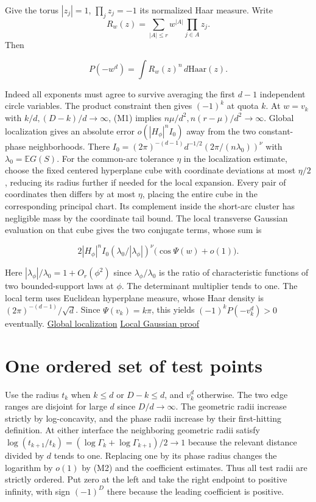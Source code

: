 Give the torus $|z_j|=1$, $\prod_j z_j=-1$ its normalized Haar measure. Write
\[R_w(z)=\sum_{|A|\le r} w^{|A|}\prod_{j\in A} z_j.\]
Then

\begin{equation*}
P(-w^d)=\int R_w(z)^n\,d\mathrm{Haar}(z).
\end{equation*}

Indeed all exponents must agree to survive averaging the first $d-1$ independent circle variables. The product constraint then gives $(-1)^k$ at quota $k$. At $w=v_k$ with $k/d,(D-k)/d\to\infty$, (M1) implies $n\mu/d^2,n(r-\mu)/d^2\to\infty$. Global localization gives an absolute error $o(|H_\phi|^nI_0)$ away from the two constant-phase neighborhoods. There $I_0=(2\pi)^{-(d-1)}d^{-1/2}(2\pi/(n\lambda_0))^{\nu}$ with $\lambda_0=\mathbb E G(S)$. For the common-arc tolerance $\eta$ in the localization estimate, choose the fixed centered hyperplane cube with coordinate deviations at most $\eta/2$, reducing its radius further if needed for the local expansion. Every pair of coordinates then differs by at most $\eta$, placing the entire cube in the corresponding principal chart. Its complement inside the short-arc cluster has negligible mass by the coordinate tail bound. The local transverse Gaussian evaluation on that cube gives the two conjugate terms, whose sum is

\begin{equation*}
2 |H_\phi|^n I_0 (\lambda_0/|\lambda_\phi|)^\nu
\big(\cos\Psi(w)+o(1)\big).
\end{equation*}

Here $|\lambda_\phi|/\lambda_0=1+O_r(\phi^2)$ since $\lambda_\phi/\lambda_0$ is the ratio of characteristic functions of two bounded-support laws at $\phi$. The determinant multiplier tends to one. The local term uses Euclidean hyperplane measure, whose Haar density is $(2\pi)^{-(d-1)}/\sqrt d$. Since $\Psi(v_k)=k\pi$, this yields $(-1)^kP(-v_k^d)>0$ eventually. \hyperref[sec:localization]{Global localization} \enspace \hyperref[sec:transverse]{Local Gaussian proof}

\section{One ordered set of test points}

Use the radius $t_k$ when $k\le d$ or $D-k\le d$, and $v_k^d$ otherwise. The two edge ranges are disjoint for large $d$ since $D/d\to\infty$. The geometric radii increase strictly by log-concavity, and the phase radii increase by their first-hitting definition. At either interface the neighboring geometric radii satisfy $\log(t_{k+1}/t_k)=(\log\Gamma_k+\log\Gamma_{k+1})/2\to1$ because the relevant distance divided by $d$ tends to one. Replacing one by its phase radius changes the logarithm by $o(1)$ by (M2) and the coefficient estimates. Thus all test radii are strictly ordered. Put zero at the left and take the right endpoint to positive infinity, with sign $(-1)^D$ there because the leading coefficient is positive.

